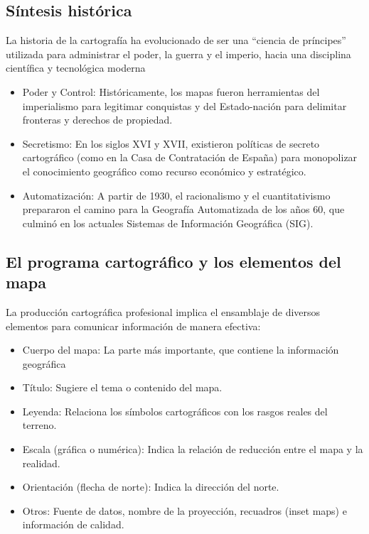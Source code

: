 \documentclass[
  letterpaper,
  DIV=11,
  numbers=noendperiod]{scrreprt}
\providecommand{\tightlist}{%
  \setlength{\itemsep}{0pt}\setlength{\parskip}{0pt}}\usepackage{longtable,booktabs,array}
\begin{document}
\subsection{Síntesis histórica}\label{suxedntesis-histuxf3rica}

La historia de la cartografía ha evolucionado de ser una ``ciencia de
príncipes'' utilizada para administrar el poder, la guerra y el imperio,
hacia una disciplina científica y tecnológica moderna

\begin{itemize}
\tightlist
\item
  Poder y Control: Históricamente, los mapas fueron herramientas del
  imperialismo para legitimar conquistas y del Estado-nación para
  delimitar fronteras y derechos de propiedad.
\item
  Secretismo: En los siglos XVI y XVII, existieron políticas de secreto
  cartográfico (como en la Casa de Contratación de España) para
  monopolizar el conocimiento geográfico como recurso económico y
  estratégico.
\item
  Automatización: A partir de 1930, el racionalismo y el cuantitativismo
  prepararon el camino para la Geografía Automatizada de los años 60,
  que culminó en los actuales Sistemas de Información Geográfica (SIG).
\end{itemize}

\subsection{El programa cartográfico y los elementos del
mapa}\label{el-programa-cartogruxe1fico-y-los-elementos-del-mapa}

La producción cartográfica profesional implica el ensamblaje de diversos
elementos para comunicar información de manera efectiva:

\begin{itemize}
\tightlist
\item
  Cuerpo del mapa: La parte más importante, que contiene la información
  geográfica
\item
  Título: Sugiere el tema o contenido del mapa.
\item
  Leyenda: Relaciona los símbolos cartográficos con los rasgos reales
  del terreno.
\item
  Escala (gráfica o numérica): Indica la relación de reducción entre el
  mapa y la realidad.
\item
  Orientación (flecha de norte): Indica la dirección del norte.
\item
  Otros: Fuente de datos, nombre de la proyección, recuadros (inset
  maps) e información de calidad.
\end{itemize}
\end{document}
